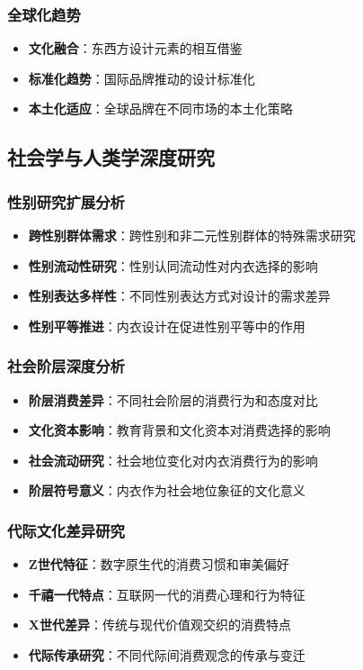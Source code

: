 \documentclass[12pt,UTF8]{ctexbook}
\begin{document}
\subsubsection{全球化趋势}
\begin{itemize}[leftmargin=2cm]
	\item \textbf{文化融合}：东西方设计元素的相互借鉴
	\item \textbf{标准化趋势}：国际品牌推动的设计标准化
	\item \textbf{本土化适应}：全球品牌在不同市场的本土化策略
\end{itemize}

\subsection{社会学与人类学深度研究}
\subsubsection{性别研究扩展分析}
\begin{itemize}[leftmargin=2cm]
	\item \textbf{跨性别群体需求}：跨性别和非二元性别群体的特殊需求研究
	\item \textbf{性别流动性研究}：性别认同流动性对内衣选择的影响
	\item \textbf{性别表达多样性}：不同性别表达方式对设计的需求差异
	\item \textbf{性别平等推进}：内衣设计在促进性别平等中的作用
\end{itemize}

\subsubsection{社会阶层深度分析}
\begin{itemize}[leftmargin=2cm]
	\item \textbf{阶层消费差异}：不同社会阶层的消费行为和态度对比
	\item \textbf{文化资本影响}：教育背景和文化资本对消费选择的影响
	\item \textbf{社会流动研究}：社会地位变化对内衣消费行为的影响
	\item \textbf{阶层符号意义}：内衣作为社会地位象征的文化意义
\end{itemize}

\subsubsection{代际文化差异研究}
\begin{itemize}[leftmargin=2cm]
	\item \textbf{Z世代特征}：数字原生代的消费习惯和审美偏好
	\item \textbf{千禧一代特点}：互联网一代的消费心理和行为特征
	\item \textbf{X世代差异}：传统与现代价值观交织的消费特点
	\item \textbf{代际传承研究}：不同代际间消费观念的传承与变迁
\end{itemize}
\end{document}
